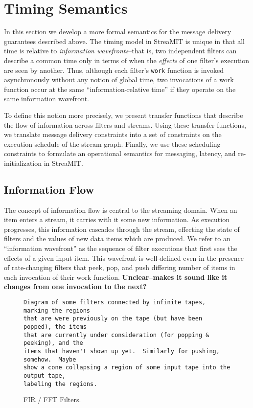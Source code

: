 \section{Timing Semantics}

In this section we develop a more formal semantics for the message
delivery guarantees described above.  The timing model in StreaMIT is
unique in that all time is relative to {\it information
wavefronts}--that is, two independent filters can describe a common time
only in terms of when the {\it effects} of one filter's execution are
seen by another.  Thus, although each filter's {\tt work} function is
invoked asynchronously without any notion of global time, two
invocations of a work function occur at the same ``information-relative
time'' if they operate on the same information wavefront.

To define this notion more precisely, we present transfer functions that
describe the flow of information across filters and streams.  Using
these transfer functions, we translate message delivery constraints into
a set of constraints on the execution schedule of the stream graph.
Finally, we use these scheduling constraints to formulate an operational
semantics for messaging, latency, and re-initialization in StreaMIT.

\subsection{Information Flow}

The concept of information flow is central to the streaming domain.
When an item enters a stream, it carries with it some new information.
As execution progresses, this information cascades through the stream,
effecting the state of filters and the values of new data items which
are produced.  We refer to an ``information wavefront'' as the
sequence of filter executions that first sees the effects of a given
input item.  This wavefront is well-defined even in the presence of
rate-changing filters that peek, pop, and push differing number of
items in each invocation of their work function. {\bf Unclear--makes
it sound like it changes from one invocation to the next?}

\begin{figure}[t]
\begin{verbatim}
Diagram of some filters connected by infinite tapes, marking the regions
that are were previously on the tape (but have been popped), the items
that are currently under consideration (for popping & peeking), and the
items that haven't shown up yet.  Similarly for pushing, somehow.  Maybe
show a cone collapsing a region of some input tape into the output tape,
labeling the regions.
\end{verbatim}
\vspace{-12pt}
\caption{\protect\small FIR / FFT Filters.}
\vspace{-12pt}
\end{figure}

